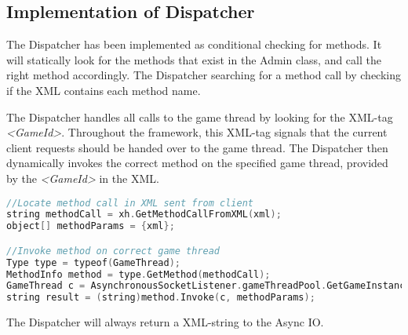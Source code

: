 \subsection{Implementation of Dispatcher}
\label{chap:dispImplementation}
The Dispatcher has been implemented as conditional checking for methods. It will statically look for the methods that exist in the Admin class, and call the right method accordingly. The Dispatcher searching for a method call by checking if the XML contains each method name.

The Dispatcher handles all calls to the game thread by looking for the XML-tag \textit{<GameId>}. Throughout the framework, this XML-tag signals that the current client requests should be handed over to the game thread. The Dispatcher then dynamically invokes the correct method on the specified game thread, provided by the \textit{<GameId>} in the XML. 

\begin{lstlisting}[caption={Dynamically invoking methods on game threads}, language=C]
//Locate method call in XML sent from client
string methodCall = xh.GetMethodCallFromXML(xml);
object[] methodParams = {xml};

//Invoke method on correct game thread
Type type = typeof(GameThread);
MethodInfo method = type.GetMethod(methodCall);
GameThread c = AsynchronousSocketListener.gameThreadPool.GetGameInstance(xh.GetGameIdFromXML(xml));
string result = (string)method.Invoke(c, methodParams);
\end{lstlisting}

The Dispatcher will always return a XML-string to the Async IO.